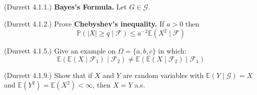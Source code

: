 \documentclass[12pt]{gradescopeexam}
\renewcommand\P{\mathbb{P}}
\newcommand\E{\mathbb{E}}
\renewcommand\c[1]{\mathcal{#1}}
\begin{document}
\makeheader
\vspace{0.1in}
\begin{questions}
  \begin{question}
    (Durrett 4.1.1.) \textbf{Bayes's Formula.} Let $G\in\c{G}$.
  \end{question}

  \begin{question}
    (Durrett 4.1.2.) Prove \textbf{Chebyshev's inequality.} If $a>0$ then
    \[ \P(|X|\ge q \mid \c{F}) \le a^{-2} \E(X^2 \mid \c{F}) \]
    \begin{prooforbox}[6.5in]
    \end{prooforbox}
  \end{question}

  \begin{question}
    (Durrett 4.1.5.) Give an example on $\Omega=\{a,b,c\}$ in which:
    \[ \E(\E(X \mid \c{F}_1) \mid\c{F}_2) \neq \E(\E(X \mid \c{F}_2)\mid \c{F}_1)  \]
    \begin{solutionorbox}[6.5in]
    \end{solutionorbox}
  \end{question}

  \begin{question}
    (Durrett 4.1.9.) Show that if $X$ and $Y$ are random variables with $\E(Y\mid \c{G})=X$ and
    $\E(Y^2)=\E(X^2)<\infty$, then $X=Y$ a.s.
    \begin{solutionorbox}[6.5in]
    \end{solutionorbox}
  \end{question}


\end{questions}
\end{document}
